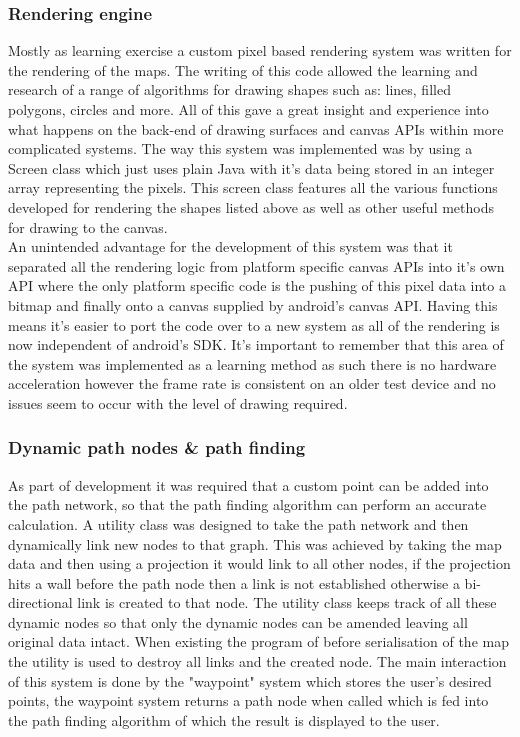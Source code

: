 \subsubsection{Rendering engine}
Mostly as learning exercise a custom pixel based rendering system was written for the rendering of the maps. The writing of this code allowed the learning and research of a range of algorithms for drawing shapes such as: lines, filled polygons, circles and more. All of this gave a great insight and experience into what happens on the back-end of drawing surfaces and canvas APIs within more complicated systems. The way this system was implemented was by using a Screen class which just uses plain Java with it's data being stored in an integer array representing the pixels. This screen class features all the various functions developed for rendering the shapes listed above as well as other useful methods for drawing to the canvas.\\

An unintended advantage for the development of this system was that it separated all the rendering logic from platform specific canvas APIs into it's own API where the only platform specific code is the pushing of this pixel data into a bitmap and finally onto a canvas supplied by android's canvas API. Having this means it's easier to port the code over to a new system as all of the rendering is now independent of android's SDK. It's important to remember that this area of the system was implemented as a learning method as such there is no hardware acceleration however the frame rate is consistent on an older test device and no issues seem to occur with the level of drawing required.

\subsubsection{Dynamic path nodes \& path finding}
As part of development it was required that a custom point can be added into the path network, so that the path finding algorithm can perform an accurate calculation. A utility class was designed to take the path network and then dynamically link new nodes to that graph. This was achieved by taking the map data and then using a projection it would link to all other nodes, if the projection hits a wall before the path node then a link is not established otherwise a bi-directional link is created to that node. The utility class keeps track of all these dynamic nodes so that only the dynamic nodes can be amended leaving all original data intact. When existing the program of before serialisation of the map the utility is used to destroy all links and the created node. The main interaction of this system is done by the "waypoint" system which stores the user's desired points, the waypoint system returns a path node when called which is fed into the path finding algorithm of which the result is displayed to the user.

